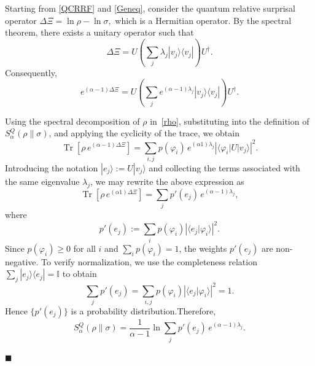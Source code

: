 \documentclass[a4paper, amsfonts, amssymb, amsmath, reprint, showkeys, nofootinbib, twoside, aps, pra]{revtex4-2}
\theoremstyle{definition}
\renewenvironment{proof}{\noindent{\bfseries Proof.}}{\hfill$\blacksquare$}
\begin{document}
\begin{proof}
Starting from \eqref{QCRRF} and \eqref{Geneq}, consider the quantum relative surprisal operator
$\Delta\Xi=\ln\rho-\ln\sigma,$ which is a Hermitian operator. By the spectral theorem, there exists a unitary operator such that
\begin{equation}
\Delta\Xi = U \left(\sum_j \lambda_j |v_j\rangle\langle v_j| \right) U^\dagger .
\end{equation}
Consequently,
\begin{equation}
e^{(\alpha-1)\Delta\Xi} = U \left(\sum_j e^{(\alpha-1)\lambda_j}|v_j\rangle\langle v_j|\right)U^\dagger .
\end{equation}

Using the spectral decomposition of $\rho$ in~\eqref{rho}, substituting into the definition of $S_\alpha^Q(\rho\|\sigma)$, and applying the cyclicity of the trace, we obtain
\begin{equation}
    \operatorname{Tr}\!\left[\rho\,e^{(\alpha-1)\Delta\Xi}\right]=\sum_{i,j}p(\varphi_i)\,e^{(\alpha1)\lambda_j}\left|\langle\varphi_i|U|v_j\rangle \right|^2 .
\end{equation}
Introducing the notation $|e_j\rangle:=U|v_j\rangle$ and collecting the terms associated with the same eigenvalue $\lambda_j$, we may rewrite the above expression as
\begin{equation}
    \operatorname{Tr}\!\left[\rho\,e^{(\alpha 1)\Delta\Xi}\right]=\sum_jp'(e_j)\,e^{(\alpha-1)\lambda_j},
\end{equation}
where
\begin{equation}
p'(e_j) := \sum_i p(\varphi_i) \left| \langle e_j|\varphi_i\rangle \right|^2.
\end{equation}
Since $p(\varphi_i) \ge 0$ for all $i$ and 
$\sum_i p(\varphi_i) = 1$, the weights $p'(e_j)$ are non-negative.
To verify normalization, we use the completeness relation
$\sum_j |e_j\rangle\langle e_j| = \mathbb{I}$ to obtain
\begin{equation}
    \sum_j p'(e_j) = \sum_{i,j} p(\varphi_i)
    \left|\langle e_j|\varphi_i\rangle\right|^2 = 1.
\end{equation}
Hence $\{p'(e_j)\}$ is a probability distribution.Therefore,
\begin{equation}
    S_\alpha^Q(\rho\|\sigma)=\frac{1}{\alpha-1}\ln\sum_j p'(e_j)\,e^{(\alpha-1)\lambda_j}.
\end{equation}


\end{proof}
\end{document}

